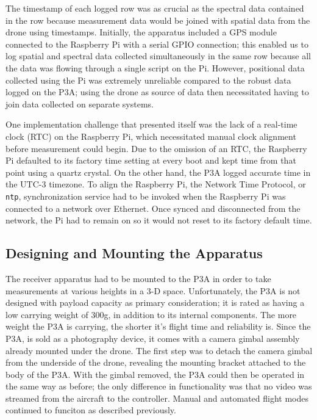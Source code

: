 \documentclass[pageno]{jpaper}
\begin{document}
The timestamp of each logged row was as crucial as the spectral data contained in the row because measurement data would be joined with spatial data from the drone using timestamps. Initially, the apparatus included a GPS module connected to the Raspberry Pi with a serial GPIO connection; this enabled us to log spatial and spectral data collected simultaneously in the same row because all the data was flowing through a single script on the Pi. However, positional data collected using the Pi was extremely unreliable compared to the robust data logged on the P3A; using the drone as source of data then necessitated having to join data collected on separate systems.

 One implementation challenge that presented itself was the lack of a real-time clock (RTC) on the Raspberry Pi, which necessitated manual clock alignment before measurement could begin. Due to the omission of an RTC, the Raspberry Pi defaulted to its factory time setting at every boot and kept time from that point using a quartz crystal. On the other hand, the P3A logged accurate time in the UTC-3 timezone. To align the Raspberry Pi, the Network Time Protocol, or \texttt{ntp}, synchronization service had to be invoked when the Raspberry Pi was connected to a network over Ethernet. Once synced and disconnected from the network, the Pi had to remain on so it would not reset to its factory default time. 

\subsection{Designing and Mounting the Apparatus}
The receiver apparatus had to be mounted to the P3A in order to take measurements at various heights in a 3-D space. Unfortunately, the P3A is not designed with payload capacity as primary consideration; it is rated as having a low carrying weight of 300g, in addition to its internal components. The more weight the P3A is carrying, the shorter it's flight time and reliability is. Since the P3A, is sold as a photography device, it comes with a camera gimbal assembly already mounted under the drone. The first step was to detach the camera gimbal from the underside of the drone, revealing the mounting bracket attached to the body of the P3A. With the gimbal removed, the P3A could then be operated in the same way as before; the only difference in functionality was that no video was streamed from the aircraft to the controller. Manual and automated flight modes continued to funciton as described previously. 
\end{document}
